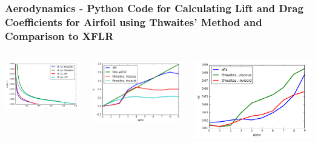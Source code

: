 \documentclass[mathserif]{beamer}
\begin{document}
\begin{frame}
\frametitle{Aerodynamics - Python Code for Calculating Lift and Drag Coefficients for Airfoil using Thwaites' Method and Comparison to XFLR}


\begin{columns}[c]
\column{1.5in}
\includegraphics[width=45mm]{fd1.png}

\includegraphics[width=5.5cm]{fd2.png}

\column{3in}
\begin{center}
\includegraphics[width=7cm]{fd3.png}

\vspace{0.1cm}
\begin{columns}[c]
\column{1.5in}

\end{columns}
\end{center}
\end{columns}


\end{frame}
\end{document}
